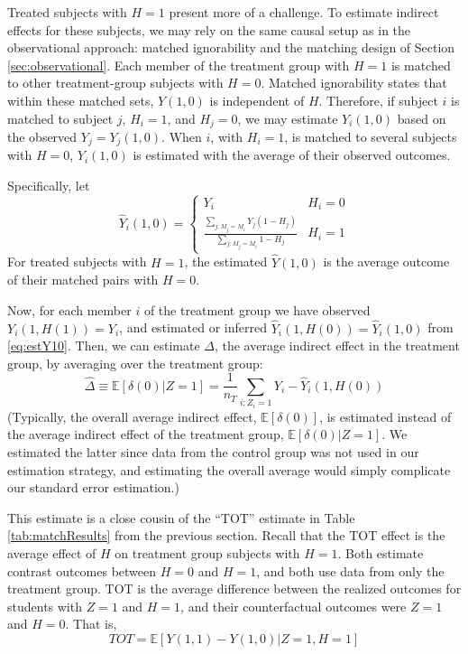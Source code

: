 \documentclass{article}\usepackage[]{graphicx}\usepackage[]{color}
\newcommand{\EE}{\mathbb{E}}
\begin{document}
Treated subjects with $H=1$ present more of a challenge.
To estimate indirect effects for these subjects, we may rely on the
same causal setup as in the observational approach:
matched ignorability and the matching design of Section
\ref{sec:observational}.
Each member of the treatment group with $H=1$ is matched to other
treatment-group subjects with $H=0$.
Matched ignorability states that within these matched sets, $Y(1,0)$
is independent of $H$.
Therefore, if subject $i$ is matched to subject $j$, $H_i=1$, and
$H_j=0$, we may estimate $Y_i(1,0)$ based on the observed
$Y_j=Y_j(1,0)$.
When $i$, with $H_i=1$, is matched to several subjects with $H=0$,
$Y_i(1,0)$ is estimated with the average of their observed outcomes.

Specifically, let
\begin{equation}\label{eq:estY10}
\hat{Y}_i(1,0)=\begin{cases}
 Y_i & H_i=0\\[3ex]
\frac{\displaystyle\sum_{j:M_j=M_i}
  Y_j(1-H_j)}{\displaystyle\sum_{j:M_j=M_i} 1-H_j} & H_i=1
\end{cases}
\end{equation}
For treated subjects with $H=1$, the estimated $\hat{Y}(1,0)$ is the
average outcome of their matched pairs with $H=0$.

Now, for each member $i$ of the treatment group we have observed
$Y_i(1,H(1))=Y_i$, and estimated or inferred
$\hat{Y}_i(1,H(0))=\hat{Y}_i(1,0)$ from \eqref{eq:estY10}.
Then, we can estimate $\Delta$, the average indirect effect in the
treatment group, by averaging over the treatment group:
\begin{equation*}
 \hat{\Delta}\equiv\widehat{\EE[\delta(0)|Z=1]}=\frac{1}{n_T}\displaystyle\sum_{i:Z_i=1} Y_i-\hat{Y}_i(1,H(0))
\end{equation*}
(Typically, the overall average indirect effect, $\EE[\delta(0)]$, is
estimated instead of the average indirect effect of the treatment
group, $\EE[\delta(0)|Z=1]$.
We estimated the latter since data from the control group was not used
in our estimation strategy, and estimating the overall average would
simply complicate our standard error estimation.)

This estimate is a close cousin of the ``TOT'' estimate in Table
\ref{tab:matchResults} from the previous section.
Recall that the TOT effect is the average effect of $H$ on treatment
group subjects with $H=1$.
Both estimate contrast outcomes between $H=0$ and $H=1$, and both use
data from only the treatment group.
TOT is the average difference between the realized outcomes for students
with $Z=1$ and $H=1$, and their counterfactual outcomes were $Z=1$ and $H=0$.
That is,
\begin{equation*}
TOT=\EE[Y(1,1)-Y(1,0)|Z=1,H=1]
\end{equation*}
\end{document}
